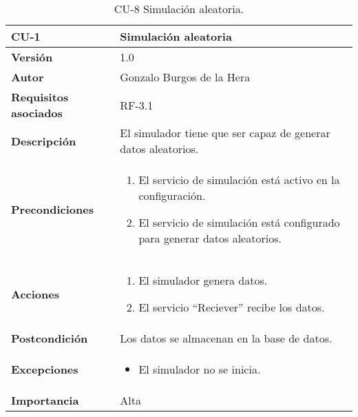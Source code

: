 \begin{table}[H]
	\centering
	\begin{tabularx}{\linewidth}{ p{} p{} }
		\toprule
		\textbf{CU-1}    & \textbf{Simulación aleatoria}\\
		\toprule
		\textbf{Versión}              & 1.0    \\
		\textbf{Autor}                & Gonzalo Burgos de la Hera \\
		\textbf{Requisitos asociados} & RF-3.1 \\
		\textbf{Descripción}          & El simulador tiene que ser capaz de generar datos aleatorios.\\
		\textbf{Precondiciones}       & 
        \begin{enumerate}
			\def\labelenumi{\arabic{enumi}.}
			\tightlist
			\item El servicio de simulación está activo en la configuración.
			\item El servicio de simulación está configurado para generar datos aleatorios.
		\end{enumerate}\\
		\textbf{Acciones}             &
		\begin{enumerate}
			\def\labelenumi{\arabic{enumi}.}
			\tightlist
			\item El simulador genera datos.
			\item El servicio ``Reciever'' recibe los datos.
		\end{enumerate}\\
		\textbf{Postcondición}        & Los datos se almacenan en la base de datos. \\
		\textbf{Excepciones}          & 
        \begin{itemize}
			\tightlist
			\item El simulador no se inicia.
        \end{itemize} \\
		\textbf{Importancia}          & Alta \\
		\bottomrule
	\end{tabularx}
	\caption{CU-8 Simulación aleatoria.}
\end{table}

